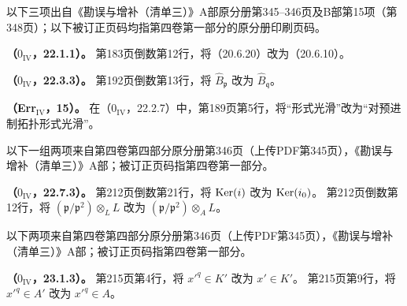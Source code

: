 以下三项出自《勘误与增补（清单三）》A部原分册第345--346页及B部第15项（第348页）；以下被订正页码均指第四卷第一部分的原分册印刷页码。

\medskip
\noindent\textbf{（$0_{\mathrm{IV}}$，22.1.1）。}
第183页倒数第12行，将（20.6.20）改为（20.6.10）。

\medskip
\noindent\textbf{（$0_{\mathrm{IV}}$，22.3.3）。}
第192页倒数第13行，将 $\widehat B_{\mathfrak p}$ 改为 $\widehat B_{\mathfrak q}$。

\medskip
\hypertarget{ErrIV:15}{}\noindent\textbf{（Err$_{\mathrm{IV}}$，15）。}
在（$0_{\mathrm{IV}}$，22.2.7）中，第189页第5行，将“形式光滑”改为“对预进制拓扑形式光滑”。


以下一组两项来自第四卷第四部分原分册第346页（上传PDF第345页），《勘误与增补（清单三）》A部；被订正页码指第四卷第一部分。

\medskip
\noindent\textbf{（$0_{\mathrm{IV}}$，22.7.3）。}
第212页倒数第21行，将 $\operatorname{Ker}(i)$ 改为 $\operatorname{Ker}(i_0)$。
第212页倒数第12行，将 $(\mathfrak p/\mathfrak p^2)\otimes_LL$ 改为 $(\mathfrak p/\mathfrak p^2)\otimes_AL$。


以下两项来自第四卷第四部分原分册第346页（上传PDF第345页），《勘误与增补（清单三）》A部；被订正页码指第四卷第一部分。

\medskip
\noindent\textbf{（$0_{\mathrm{IV}}$，23.1.3）。}
第215页第4行，将 $x'^q\in K'$ 改为 $x'\in K'$。
第215页第9行，将 $x'^q\in A'$ 改为 $x'^q\in A$。
